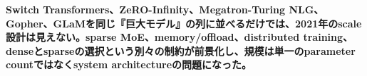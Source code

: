 \noindent\textbf{Switch Transformers、ZeRO-Infinity、Megatron-Turing NLG、Gopher、GLaMを同じ『巨大モデル』の列に並べるだけでは、2021年のscale設計は見えない。sparse MoE、memory/offload、distributed training、denseとsparseの選択という別々の制約が前景化し、規模は単一のparameter countではなくsystem architectureの問題になった。}\autocite{src-0028da50cfe5,src-7652e568e428,src-7b8be93e524d,src-7fa5b597ba1f,src-b307b4b82867,src-d15ca2441916}
